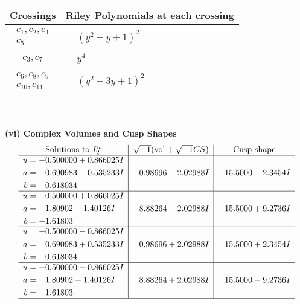 \documentclass[1p]{elsarticle_modified}
\theoremstyle{definition}
\newcommand{\I}{\sqrt{-1}}
\begin{document}
\begin{tabular}{m{50pt}|m{274pt}}
Crossings & \hspace{64pt}Riley Polynomials at each crossing \\
\hline $$\begin{aligned}c_{1},c_{2},c_{4}\\c_{5}\end{aligned}$$&$\begin{aligned}
&(y^2+y+1)^2
\end{aligned}$\\
\hline $$\begin{aligned}c_{3},c_{7}\end{aligned}$$&$\begin{aligned}
&y^4
\end{aligned}$\\
\hline $$\begin{aligned}c_{6},c_{8},c_{9}\\c_{10},c_{11}\end{aligned}$$&$\begin{aligned}
&(y^2-3 y+1)^2
\end{aligned}$\\
\hline
\end{tabular}\\~\\
\newpage\flushleft \textbf{(vi) Complex Volumes and Cusp Shapes}
$$\begin{array}{c|c|c}  
\text{Solutions to }I^u_{2}& \I (\text{vol} + \sqrt{-1}CS) & \text{Cusp shape}\\
 \hline 
\begin{aligned}
u &= -0.500000 + 0.866025 I \\
a &= \phantom{-}0.690983 - 0.535233 I \\
b &= \phantom{-}0.618034\phantom{ +0.000000I}\end{aligned}
 & \phantom{-}0.98696 - 2.02988 I & \phantom{-}15.5000 - 2.3454 I \\ \hline\begin{aligned}
u &= -0.500000 + 0.866025 I \\
a &= \phantom{-}1.80902 + 1.40126 I \\
b &= -1.61803\phantom{ +0.000000I}\end{aligned}
 & \phantom{-}8.88264 - 2.02988 I & \phantom{-}15.5000 + 9.2736 I \\ \hline\begin{aligned}
u &= -0.500000 - 0.866025 I \\
a &= \phantom{-}0.690983 + 0.535233 I \\
b &= \phantom{-}0.618034\phantom{ +0.000000I}\end{aligned}
 & \phantom{-}0.98696 + 2.02988 I & \phantom{-}15.5000 + 2.3454 I \\ \hline\begin{aligned}
u &= -0.500000 - 0.866025 I \\
a &= \phantom{-}1.80902 - 1.40126 I \\
b &= -1.61803\phantom{ +0.000000I}\end{aligned}
 & \phantom{-}8.88264 + 2.02988 I & \phantom{-}15.5000 - 9.2736 I\\
 \hline 
 \end{array}$$\newpage
\end{document}
